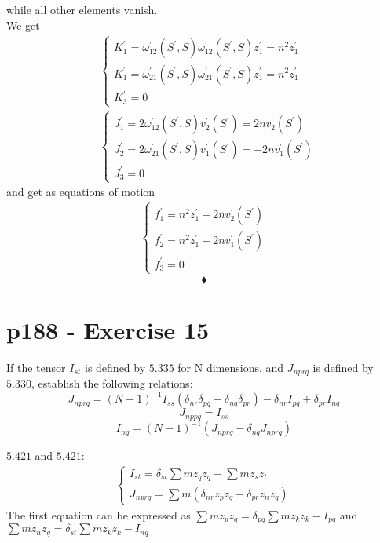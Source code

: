 while all other elements vanish.\\
We get 
\begin{align}
&\left\{\begin{array}{l}
K^{'}_1 = \omega^{'}_{12}\left(S^{'},S\right)\omega^{'}_{12}\left(S^{'},S\right)z^{'}_1 = n^2 z_1^{'}\\
K^{'}_1 = \omega^{'}_{21}\left(S^{'},S\right)\omega^{'}_{21}\left(S^{'},S\right)z^{'}_1 = n^2 z_1^{'}\\
K^{'}_3 = 0
\end{array}\right.\\
&\left\{\begin{array}{l}
J^{'}_1= 2\omega^{'}_{12}\left(S^{'},S\right)v^{'}_2\left(S^{'}\right)=2 n v_2^{'}\left(S^{'}\right)\\
J^{'}_2= 2\omega^{'}_{21}\left(S^{'},S\right)v^{'}_1\left(S^{'}\right)=-2 n v_1^{'}\left(S^{'}\right)\\
J^{'}_3 = 0
\end{array}\right.
\end{align}
and get as equations of motion
\begin{align}
\left\{\begin{array}{l}
f^{'}_1= n^2z_1^{'} +2nv^{'}_2\left(S^{'}\right)\\
f^{'}_2= n^2z_1^{'} -2nv^{'}_1\left(S^{'}\right)\\
f^{'}_3= 0
\end{array}\right.
\end{align}
$$\blacklozenge$$
\newpage

\section{p188 - Exercise 15}
\begin{tcolorbox}
If the tensor $I_{st}$ is defined by $\mathbf{5.335}$ for N dimensions, and $J_{nprq}$ is defined by $\mathbf{5.330}$, establish the following relations:
$$J_{nprq}= \left(N-1\right)^{-1}I_{ss}\left(\delta_{nr}\delta_{pq}- \delta_{nq}\delta_{pr}\right) - \delta_{nr}I_{pq}+\delta_{pr}I_{nq}$$
$$J_{nppq}=I_{ss}$$
$$I_{nq}= \left(N-1\right)^{-1}\left(J_{nprq}-\delta_{nq}J_{nprq}\right) $$
\end{tcolorbox} 
$\mathbf{5.421}$ and $\mathbf{5.421}$:
\begin{align}
\left\{\begin{array}{l}
I_{st}= \delta_{st}\sum m z_q z_q - \sum m z_s z_t\\
J_{nprq} = \sum m \left( \delta_{nr} z_p z_q - \delta_{pr} z_n z_q \right)
\end{array}\right.
\end{align}
The first equation can be expressed as $ \sum m z_p z_q=  \delta_{pq}\sum m z_k z_k-I_{pq}$ and $ \sum m z_n z_q=  \delta_{st}\sum m z_k z_k-I_{nq}$ 

